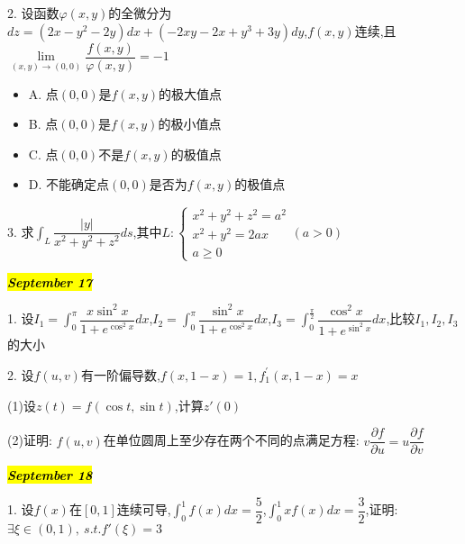 2. 设函数$\varphi(x,y)$的全微分为$dz=(2x-y^2-2y)dx+(-2xy-2x+y^3+3y)dy$,$f(x,y)$连续,且$\lim\limits_{(x,y)\rightarrow (0,0)}\dfrac{f(x,y)}{\varphi(x,y)}=-1$
\begin{itemize}
	\item A. 点$(0,0)$是$f(x,y)$的极大值点
	\item B. 点$(0,0)$是$f(x,y)$的极小值点
	\item C. 点$(0,0)$不是$f(x,y)$的极值点
	\item D. 不能确定点$(0,0)$是否为$f(x,y)$的极值点
\end{itemize}
\begin{solution}
	
\end{solution}

3. 求$\int_{L}\dfrac{|y|}{x^2+y^2+z^2}ds$,其中$L:\left\lbrace 
\begin{array}{l}
	x^2+y^2+z^2=a^2\\
	x^2+y^2=2ax\\
	a\geq 0
\end{array}
\right. (a>0)$

\begin{solution}
	
\end{solution}

\hl{\textbf{\textit{September 17}}}

1. 设$I_{1}=\int_{0}^{\pi}\dfrac{x\sin^2 x}{1+e^{\cos^2 x}}dx$,$I_{2}=\int_{0}^{\pi}\dfrac{\sin^2 x}{1+e^{\cos^2 x}}dx$,$I_{3}=\int_{0}^{\frac{\pi}{2}}\dfrac{\cos^2 x}{1+e^{\sin^2 x}}dx$,比较$I_{1},I_{2},I_{3}$的大小
\begin{solution}
	
\end{solution}

2. 设$f(u,v)$有一阶偏导数,$f(x,1-x)=1,f_{1}^{'}(x,1-x)=x$

(1)设$z(t)=f(\cos t,\sin t)$,计算$z'(0)$

(2)证明:  $f(u,v)$在单位圆周上至少存在两个不同的点满足方程:  $v\dfrac{\partial f}{\partial u}=u\dfrac{\partial f}{\partial v}$
\begin{solution}
	
\end{solution}

\hl{\textbf{\textit{September 18}}}

1. 设$f(x)$在$[0,1]$连续可导,$\int_{0}^{1}f(x)dx=\dfrac{5}{2}$,$\int_{0}^{1}xf(x)dx=\dfrac{3}{2}$,证明:$\exists \xi\in(0,1),\ s.t. f'(\xi)=3$
\begin{solution}
	
\end{solution}

